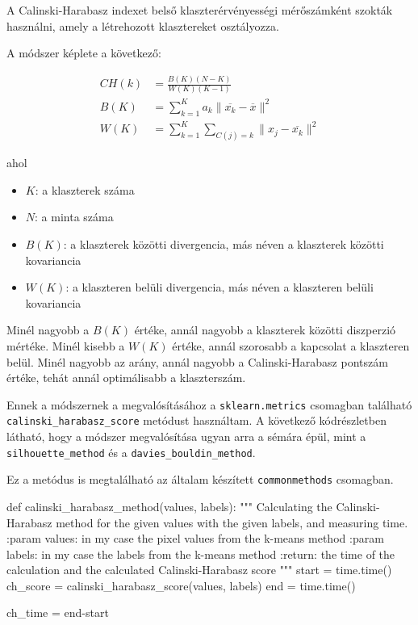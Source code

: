 
A Calinski-Harabasz indexet belső klaszterérvényességi mérőszámként szokták használni, amely a létrehozott klasztereket osztályozza.

A módszer képlete a következő:

\begin{align*}
 CH(k) & =\frac{B(K)(N-K)}{W(K)(K-1)} \\
 B(K) & =\sum_{k=1}^{K}a_k \|\overline{x_k}-\overline{x}\|^2 \\
 W(K) & =\sum_{k=1}^{K}\sum_{C(j)=k}\|x_j-\overline{x_k}\|^2
\end{align*}

\noindent ahol
\begin{itemize}
\item $K$: a klaszterek száma
\item $N$: a minta száma
\item $B(K)$: a klaszterek közötti divergencia, más néven a klaszterek közötti kovariancia
\item $W(K)$: a klaszteren belüli divergencia, más néven a klaszteren belüli kovariancia
\end{itemize}

Minél nagyobb a $B(K)$ értéke, annál nagyobb a klaszterek közötti diszperzió mértéke. Minél kisebb a $W(K)$ értéke, annál szorosabb a kapcsolat a klaszteren belül. Minél nagyobb az arány, annál nagyobb a Calinski-Harabasz pontszám értéke, tehát annál optimálisabb a klaszterszám. \cite{silhouette_calinski}

Ennek a módszernek a megvalósításához a \texttt{sklearn.metrics} csomagban található \texttt{calinski\_harabasz\_score} metódust használtam. A következő kódrészletben látható, hogy a módszer megvalósítása ugyan arra a sémára épül, mint a \texttt{silhouette\_method} és a \texttt{davies\_bouldin\_method}.

Ez a metódus is megtalálható az általam készített \texttt{commonmethods} csomagban.
\begin{python}
def calinski_harabasz_method(values, labels):
    """
    Calculating the Calinski-Harabasz method for the given values with
    the given labels, and measuring time.
    :param values: in my case the pixel values from the k-means method
    :param labels: in my case the labels from the k-means method
    :return: the time of the calculation and
        the calculated Calinski-Harabasz score
    """
    start = time.time()
    ch_score = calinski_harabasz_score(values, labels)
    end = time.time()

    ch_time = end-start
\end{python}

